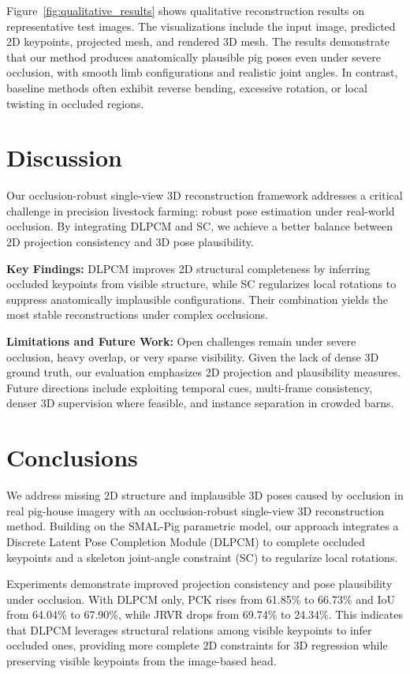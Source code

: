 \documentclass[computers,article,submit,pdftex,moreauthors]{mdpi}
\begin{document}
Figure~\ref{fig:qualitative_results} shows qualitative reconstruction results on representative test images. The visualizations include the input image, predicted 2D keypoints, projected mesh, and rendered 3D mesh. The results demonstrate that our method produces anatomically plausible pig poses even under severe occlusion, with smooth limb configurations and realistic joint angles. In contrast, baseline methods often exhibit reverse bending, excessive rotation, or local twisting in occluded regions.

\section{Discussion}\label{sec:discussion}

Our occlusion-robust single-view 3D reconstruction framework addresses a critical challenge in precision livestock farming: robust pose estimation under real-world occlusion. By integrating DLPCM and SC, we achieve a better balance between 2D projection consistency and 3D pose plausibility.

\textbf{Key Findings:} DLPCM improves 2D structural completeness by inferring occluded keypoints from visible structure, while SC regularizes local rotations to suppress anatomically implausible configurations. Their combination yields the most stable reconstructions under complex occlusions.

\textbf{Limitations and Future Work:} Open challenges remain under severe occlusion, heavy overlap, or very sparse visibility. Given the lack of dense 3D ground truth, our evaluation emphasizes 2D projection and plausibility measures. Future directions include exploiting temporal cues, multi-frame consistency, denser 3D supervision where feasible, and instance separation in crowded barns.

\section{Conclusions}\label{sec:conclusions}

We address missing 2D structure and implausible 3D poses caused by occlusion in real pig-house imagery with an occlusion-robust single-view 3D reconstruction method. Building on the SMAL-Pig parametric model, our approach integrates a Discrete Latent Pose Completion Module (DLPCM) to complete occluded keypoints and a skeleton joint-angle constraint (SC) to regularize local rotations.

Experiments demonstrate improved projection consistency and pose plausibility under occlusion. With DLPCM only, PCK rises from 61.85\% to 66.73\% and IoU from 64.04\% to 67.90\%, while JRVR drops from 69.74\% to 24.34\%. This indicates that DLPCM leverages structural relations among visible keypoints to infer occluded ones, providing more complete 2D constraints for 3D regression while preserving visible keypoints from the image-based head.
\end{document}
